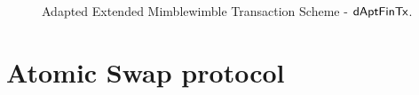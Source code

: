 \begin{landscape}
    \thispagestyle{plain}
    \begin{figure}
        \caption{Adapted Extended Mimblewimble Transaction Scheme - $\mathsf{dAptFinTx}$. \label{fig:inst-apt-mw-tx-fin}}
    \end{figure}
\end{landscape}

\section{Atomic Swap protocol}\label{sec:atomic-swap}

